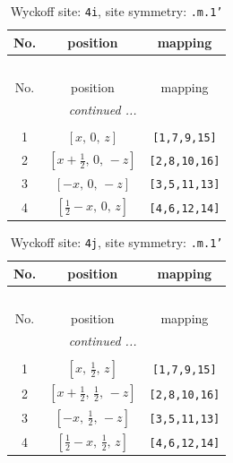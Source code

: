 \documentclass[fleqn,8pt]{jsarticle}
\begin{document}
\renewcommand{\arraystretch}{1.2}
\begin{longtable}{ccc}
\caption{Wyckoff site: {\tt 4i}, site symmetry: {\tt .m.1'}}
 \\
 \hline \hline
No. & position & mapping \\ \hline \endfirsthead

\multicolumn{2}{l}{\tablename\ \thetable{}} \\
 \hline \hline
No. & position & mapping \\ \hline \endhead

 \hline \hline
\multicolumn{2}{r}{\footnotesize\it continued ...} \\ \endfoot

 \hline \hline
\multicolumn{2}{r}{} \\ \endlastfoot

1 & $\left[ x,\, 0,\, z \right]$ & {\tt [1,7,9,15]} \\ \hline
2 & $\left[ x + \frac{1}{2},\, 0,\, - z \right]$ & {\tt [2,8,10,16]} \\ \hline
3 & $\left[ - x,\, 0,\, - z \right]$ & {\tt [3,5,11,13]} \\ \hline
4 & $\left[ \frac{1}{2} - x,\, 0,\, z \right]$ & {\tt [4,6,12,14]} \\
\end{longtable}
\renewcommand{\arraystretch}{1.2}
\begin{longtable}{ccc}
\caption{Wyckoff site: {\tt 4j}, site symmetry: {\tt .m.1'}}
 \\
 \hline \hline
No. & position & mapping \\ \hline \endfirsthead

\multicolumn{2}{l}{\tablename\ \thetable{}} \\
 \hline \hline
No. & position & mapping \\ \hline \endhead

 \hline \hline
\multicolumn{2}{r}{\footnotesize\it continued ...} \\ \endfoot

 \hline \hline
\multicolumn{2}{r}{} \\ \endlastfoot

1 & $\left[ x,\, \frac{1}{2},\, z \right]$ & {\tt [1,7,9,15]} \\ \hline
2 & $\left[ x + \frac{1}{2},\, \frac{1}{2},\, - z \right]$ & {\tt [2,8,10,16]} \\ \hline
3 & $\left[ - x,\, \frac{1}{2},\, - z \right]$ & {\tt [3,5,11,13]} \\ \hline
4 & $\left[ \frac{1}{2} - x,\, \frac{1}{2},\, z \right]$ & {\tt [4,6,12,14]} \\
\end{longtable}
\end{document}
